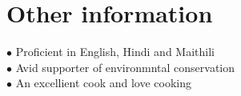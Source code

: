 \documentclass[letterpaper]{twentysecondcv} %
\begin{document}
\iffalse
\section{Publications}

\begin{twentyshort} %
	\twentyitemshort{1865}{Chapter One, Down the Rabbit Hole.}
	\twentyitemshort{1865}{Chapter Two, The Pool of Tears.}
	\twentyitemshort{1865}{Chapter Three,  The Caucus Race and a Long Tale.}
	\twentyitemshort{1865}{Chapter Four,  The Rabbit Sends a Little Bill.}
	\twentyitemshort{1865}{Chapter Five,  Advice from a Caterpillar.}
\end{twentyshort}
\fi

\iffalse
\section{Awards}

\begin{twentyshort} %
	\twentyitemshort{1987}{All-Time Best Fantasy Novel.}
	\twentyitemshort{1998}{All-Time Best Fantasy Novel before 1990.}
\end{twentyshort}
\fi


\section{Other information}

$\bullet$ Proficient in English, Hindi and Maithili\\
$\bullet$ Avid supporter of environmntal conservation\\
$\bullet$ An excellient cook and love cooking\\
\end{document}
